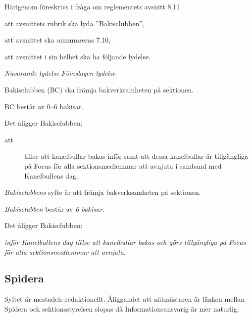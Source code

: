 \documentclass{article}
\newenvironment{lydelse}
    {\begin{paracol}{2}%
        \emph{Nuvarande lydelse}%
        \switchcolumn%
        \emph{Föreslagen lydelse}%
    \end{paracol}%
    \begin{enumerate}[label=\thesubsection.\arabic*]%
    \begin{paracol}{2}%
    }{\end{paracol}\end{enumerate}}
\begin{document}
Härigenom föreskrivs i fråga om reglementets avsnitt 8.11

\begin{dels}
    \item att avsnittets rubrik ska lyda ''Bakisclubben'',
    \item att avsnittet ska omnumreras 7.10,
    \item att avsnittet i sin helhet ska ha följande lydelse.
\end{dels}
\begin{lydelse}
    \setcounter{section}{8}
    \setcounter{subsection}{11}
    
    \item Bakisclubben (BC) ska främja bakverksamheten på sektionen.

	\item BC består av 0--6 bakisar.

	\item Det åligger Bakisclubben:
	\begin{description}
		\item[att] tillse att kanelbullar bakas inför samt att dessa kanelbullar är tillgängliga på Focus för alla sektionsmedlemmar att avnjuta i samband med Kanelbullens dag.
	\end{description}
    
    \setcounter{section}{7}
    \setcounter{subsection}{10}
    \switchcolumn
    
    \item \emph{Bakisclubbens} syfte är att främja bakverksamheten på sektionen.

    \item \emph{Bakisclubben} består av \emph{6 bakisar}.
    
    \item Det åligger Bakisclubben:
    \begin{aligganden}
        \item \emph{inför Kanelbullens dag tillse att kanelbullar bakas och görs tillgängliga på Focus för alla sektionsmedlemmar att avnjuta.}
    \end{aligganden}
    
\end{lydelse}

\subsection{Spidera}
Syftet är mestadels redaktionellt.
Åliggandet att nätmästaren är länken mellan Spidera och sektionsstyrelsen slopas då Informationsansvarig är mer naturlig.
\end{document}
